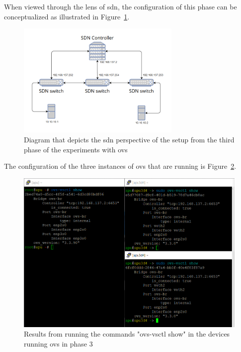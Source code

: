 
When viewed through the lens of \gls{sdn}, the configuration of this phase can be conceptualized as illustrated in Figure~\ref{fig:exp1_phase4_sdn_diagram}.

\begin{figure}
	\centering
	\includegraphics[width=0.7\textwidth]{Chapters/Figures/tests/ovs_phase_4/sdn_diagram.PNG}
	\caption{Diagram that depicts the \gls{sdn} perspective of the setup from the third phase of the experiments with \gls{ovs}}
	\label{fig:exp1_phase4_sdn_diagram}
\end{figure}

The configuration of the three instances of \gls{ovs} that are running is Figure~\ref{fig:exp1_phase4_config}.

\begin{figure}
	\centering
	\includegraphics[width=\textwidth]{Chapters/Figures/tests/ovs_phase_4/ovs_config.PNG}
	\caption{Results from running the commands "ovs-vsctl show" in the devices running \gls{ovs} in phase 3}
	\label{fig:exp1_phase4_config}
\end{figure}

